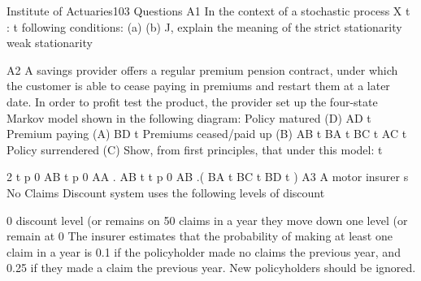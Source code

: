 \documentclass[a4paper,12pt]{article}
\begin{document}
\begin{enumerate}

Institute of Actuaries103 Questions
A1
In the context of a stochastic process {X t : t
following conditions:
(a)
(b)
J}, explain the meaning of the
strict stationarity
weak stationarity

A2
A savings provider offers a regular premium pension contract, under which the customer is able to cease paying in premiums and restart them at a later date. In order
to profit test the product, the provider set up the four-state Markov model shown in the following diagram:
Policy
matured
(D)
AD
t
Premium
paying
(A)
BD
t
Premiums
ceased/paid up
(B)
AB
t
BA
t
BC
t
AC
t
Policy
surrendered
(C)
Show, from first principles, that under this model:
t

 2
t
p 0 AB
t
p 0 AA .
AB
t
t
p 0 AB .(
BA
t
BC
t
BD
t )
A3
A motor insurer s No Claims Discount system uses the following levels of discount
{0%
discount level (or remains on 50%
claims in a year they move down one level (or remain at 0%
The insurer estimates that the probability of making at least one claim in a year is 0.1
if the policyholder made no claims the previous year, and 0.25 if they made a claim
the previous year.
New policyholders should be ignored.


}
\end{enumerate}
\end{document}
